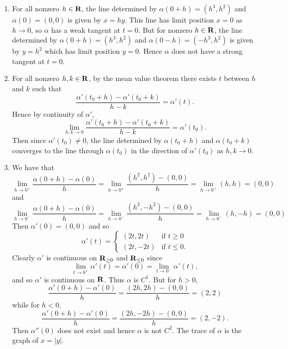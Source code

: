 \begin{ex}
\begin{enumerate}
\item For all nonzero $h \in \mathbf{R}$, the line determined by $\alpha(0 + h) = (h^3, h^2)$ and $\alpha(0) = (0, 0)$ is given by $x = hy$. This line has limit position $x = 0$ as $h \to 0$, so $\alpha$ has a weak tangent at $t = 0$. But for nonzero $h \in \mathbf{R}$, the line determined by $\alpha(0 + h) = (h^3, h^2)$ and $\alpha(0 - h) = (-h^3, h^2)$ is given by $y = h^2$ which has limit position $y = 0$. Hence $\alpha$ does not have a strong tangent at $t = 0$.

\item For all nonzero $h, k \in \mathbf{R}$, by the mean value theorem there exists $t$ between $h$ and $k$ such that \[\frac{\alpha'(t_0 + h) - \alpha'(t_0 + k)}{h-k} = \alpha'(t).\] Hence by continuity of $\alpha'$, \[\lim_{h, k \to 0}\frac{\alpha'(t_0 + h) - \alpha'(t_0 + k)}{h-k} = \alpha'(t_0).\] Then since $\alpha'(t_0) \not = 0$, the line determined by $\alpha(t_0 + h)$ and $\alpha(t_0 + k)$ converges to the line through $\alpha(t_0)$ in the direction of $\alpha'(t_0)$ as $h, k \to 0$.

\item We have that \[\lim_{h\to 0^+}\frac{\alpha(0 + h)-\alpha(0)}{h} = \lim_{h\to 0^+}\frac{(h^2, h^2)-(0, 0)}{h} = \lim_{h\to 0^+}(h, h) = (0, 0)\] and \[\lim_{h\to 0^-}\frac{\alpha(0 + h)-\alpha(0)}{h} = \lim_{h\to 0^-}\frac{(h^2, -h^2) - (0, 0)}{h} = \lim_{h\to 0^-}(h, -h) = (0, 0)\] Then $\alpha'(0) = (0, 0)$ and so \[\alpha'(t) = \begin{cases}
(2t, 2t) & \text{if } t \geq 0\\
(2t, -2t) & \text{if } t \leq 0.
\end{cases}\] Clearly $\alpha'$ is continuous on $\mathbf{R}_{\geq 0}$ and $\mathbf{R}_{\leq 0}$ since \[\lim_{t\to 0^+}\alpha'(t) = \alpha'(0) = \lim_{t\to 0^-}\alpha'(t),\] and so $\alpha'$ is continuous on $\mathbf{R}$. Thus $\alpha$ is $C^1$. But for $h > 0$, \[\frac{\alpha'(0 + h) - \alpha'(0)}{h} = \frac{(2h, 2h) - (0, 0)}{h} = (2, 2)\] while for $h < 0$, \[\frac{\alpha'(0 + h) - \alpha'(0)}{h} = \frac{(2h, -2h) - (0, 0)}{h} = (2, -2).\] Then $\alpha''(0)$ does not exist and hence $\alpha$ is not $C^2$. The trace of $\alpha$ is the graph of $x = |y|$.
\end{enumerate}
\end{ex}

